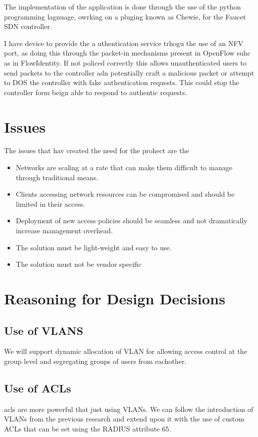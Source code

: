 
The implementation of the application is done through the use of the python programming lagnuage, owrking on a pluging known as Chewie, for the Faucet SDN controller.

I have device to provide the a uthentication service trhogu the use of an NFV port, as doing this through the packet-in mechanisms present in OpenFlow suhc as in FlowIdentity. If not policed correctly this allows unauthenticated users to send packets to the controller adn potentially craft a malicious packet or attempt to DOS the controller with fake authentication requests. This could stop the controller form beign able to respond to authentic requests. 



\section{Issues}
The issues that hav created the need for the prohect are the 
\begin{itemize}
    \item Networks are scaling at a rate that can make them difficult to manage through traditional means.
    \item Clients accessing network resources can be compromised and should be limited in their access.
    \item Deployment of new access policies should be seamless and not dramatically increase management overhead.
    \item The solution must be light-weight and easy to use.
    \item The solution must not be vendor specific
\end{itemize}


\section{Reasoning for Design Decisions}
\subsection{Use of VLANS}
We will support dynamic allocation of VLAN for allowing access control at the group level and segregating groups of users from eachother.

\subsection{Use of ACLs}
acls are more powerful that just using VLANs. We can follow the introduction of VLANs from the previous research and extend upon it with the use of custom ACLs that can be set using the RADIUS attribute 65.

